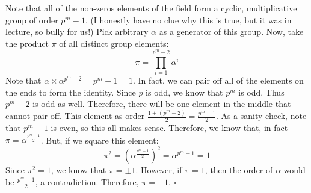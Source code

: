 \documentclass[letterpaper]{article}
\newcommand*{\QED}{\hfill\ensuremath{\square}}%
\begin{document}
Note that all of the non-zeros elements of the field form a cyclic, multiplicative group of order $ p^{m} - 1 $.
(I honestly have no clue why this is true, but it was in lecture, so bully for us!)
Pick arbitrary $ \alpha $ as a generator of this group.
Now, take the product $ \pi $ of all distinct group elements:
\[
\pi = \prod_{i = 1}^{p^{m} - 2} \alpha^i
\]
Note that $ \alpha \times \alpha^{p^{m} - 2} = p^{m} - 1 = 1 $.
In fact, we can pair off all of the elements on the ends to form the identity.
Since $ p $ is odd, we know that $ p^{m} $ is odd.
Thus $ p^{m} - 2 $ is odd as well.
Therefore, there will be one element in the middle that cannot pair off.
This element as order $ \frac{1 + (p^m - 2)}{2} = \frac{p^m - 1}{2} $.
As a sanity check, note that $ p^m - 1 $ is even, so this all makes sense.
Therefore, we know that, in fact $ \pi = \alpha^{\frac{p^m - 1}{2}} $.
But, if we square this element:
\[
\pi^2 = \left(\alpha^{\frac{p^m - 1}{2}} \right)^2 = \alpha^{p^m - 1} = 1
\]
Since $ \pi^2 = 1 $, we know that $ \pi = \pm 1 $.
However, if $ \pi = 1 $, then the order of $ \alpha $ would be $ \frac{p^m - 1}{2} $, a contradiction.
Therefore, $ \pi = -1 $.
\QED{}
\end{document}
